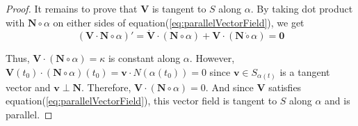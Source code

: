 \begin{proof}
	It remains to prove that $\mathbf{V}$ is tangent to $S$ along $\alpha$.
	By taking dot product with $\mathbf{N} \circ \alpha$ on either sides of equation(\ref{eq:parallelVectorField}), we get
\begin{equation}
	(\mathbf{V} \cdot \mathbf{N} \circ \alpha)'= \dot{\mathbf{V}} \cdot (\mathbf{N} \circ \alpha) + \mathbf{V} \cdot (\mathbf{N} \dot{\circ} \alpha) = \mathbf{0}
\end{equation}

	Thus, $\mathbf{V} \cdot (\mathbf{N} \circ \alpha) = \kappa$ is constant along $\alpha$.
	However, $\mathbf{V}(t_0) \cdot (\mathbf{N} \circ \alpha)(t_0) = \mathbf{v} \cdot N(\alpha(t_0)) = 0$ since $\mathbf{v} \in S_{\alpha(t)}$ is a tangent vector and $\mathbf{v} \perp \mathbf{N}$.
	Therefore, $\mathbf{V} \cdot (\mathbf{N} \circ \alpha) = 0$.
	And since $\mathbf{V}$ satisfies equation(\ref{eq:parallelVectorField}), this vector field is tangent to $S$ along $\alpha$ and is parallel.
\end{proof}



